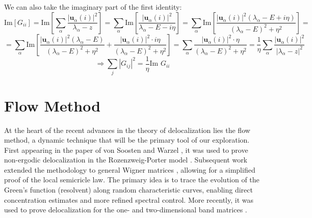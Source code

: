 \documentclass[11pt]{article}
\newcommand{\im}{\text{Im }}
\begin{document}
We can also take the imaginary part of the first identity:
$$\text{Im}[G_{ii}] = \text{Im}\left[\sum_\alpha \frac{|\mathbf{u}_\alpha(i)|^2}{\lambda_\alpha - z}\right]
= \sum_\alpha \text{Im}\left[\frac{|\mathbf{u}_\alpha(i)|^2}{\lambda_\alpha - E - i\eta}\right]=\sum_\alpha \text{Im}\left[\frac{|\mathbf{u}_\alpha(i)|^2(\lambda_\alpha - E + i\eta)}{(\lambda_\alpha - E)^2 + \eta^2}\right]= $$
$$= \sum_\alpha \text{Im}\left[\frac{|\mathbf{u}_\alpha(i)|^2(\lambda_\alpha - E)}{(\lambda_\alpha - E)^2 + \eta^2} + \frac{|\mathbf{u}_\alpha(i)|^2 \cdot i\eta}{(\lambda_\alpha - E)^2 + \eta^2}\right] 
= \sum_\alpha \frac{|\mathbf{u}_\alpha(i)|^2 \cdot \eta}{(\lambda_\alpha - E)^2 + \eta^2} = \frac{1}{\eta} \sum_\alpha \frac{|\mathbf{u}_\alpha(i)|^2}{|\lambda_\alpha - z|^2}$$
$$\Rightarrow \sum_j |G_{ij}|^2 = \frac{1}{\eta}\im G_{ii}$$




\newpage
\section{Flow Method}
\label{sec:flow}
At the heart of the recent advances in the theory of delocalization lies the flow method, a dynamic technique that will be the primary tool of our exploration. First appearing in the paper of von Soosten and Warzel \cite{RP}, it was used to prove non-ergodic delocalization in the Rozenzweig-Porter model \cite{porter1960}. Subsequent work \cite{soosten} extended the methodology to general Wigner matrices \cite{dynamic}, allowing for a simplified proof of the local semicricle law. The primary idea is to trace the evolution of the Green's function (resolvent) along random characteristic curves, enabling direct concentration estimates and more refined spectral control. More recently, it was used to prove delocalization for the one- and two-dimensional band matrices \cite{yauyin, twodim}\vspace{0.255cm}.
\end{document}
